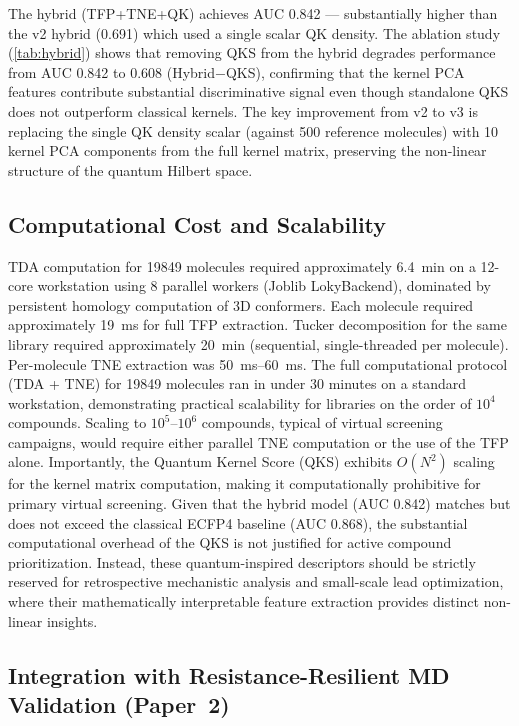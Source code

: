\documentclass[11pt,a4paper]{article}
\begin{document}
The hybrid (TFP+TNE+QK) achieves AUC 0.842 --- substantially higher than the v2 hybrid (0.691) which used a single scalar QK density. The ablation study (\cref{tab:hybrid}) shows that removing QKS from the hybrid degrades performance from AUC 0.842 to 0.608 (Hybrid$-$QKS), confirming that the kernel PCA features contribute substantial discriminative signal even though standalone QKS does not outperform classical kernels. The key improvement from v2 to v3 is replacing the single QK density scalar (against 500 reference molecules) with 10 kernel PCA components from the full kernel matrix, preserving the non-linear structure of the quantum Hilbert space.

\subsection{Computational Cost and Scalability}

TDA computation for \num{19849} molecules required approximately \SI{6.4}{\minute} on a 12-core workstation using 8 parallel workers (Joblib LokyBackend), dominated by persistent homology computation of 3D conformers. Each molecule required approximately \SI{19}{\milli\second} for full TFP extraction. Tucker decomposition for the same library required approximately \SI{20}{\minute} (sequential, single-threaded per molecule). Per-molecule TNE extraction was \SIrange{50}{60}{\milli\second}. The full computational protocol (TDA + TNE) for \num{19849} molecules ran in under 30 minutes on a standard workstation, demonstrating practical scalability for libraries on the order of $10^4$ compounds. Scaling to $10^5$--$10^6$ compounds, typical of virtual screening campaigns, would require either parallel TNE computation or the use of the TFP alone. Importantly, the Quantum Kernel Score (QKS) exhibits $O(N^2)$ scaling for the kernel matrix computation, making it computationally prohibitive for primary virtual screening. Given that the hybrid model (AUC 0.842) matches but does not exceed the classical ECFP4 baseline (AUC 0.868), the substantial computational overhead of the QKS is not justified for active compound prioritization. Instead, these quantum-inspired descriptors should be strictly reserved for retrospective mechanistic analysis and small-scale lead optimization, where their mathematically interpretable feature extraction provides distinct non-linear insights.

\subsection{Integration with Resistance-Resilient MD Validation (Paper~2)}
\end{document}
